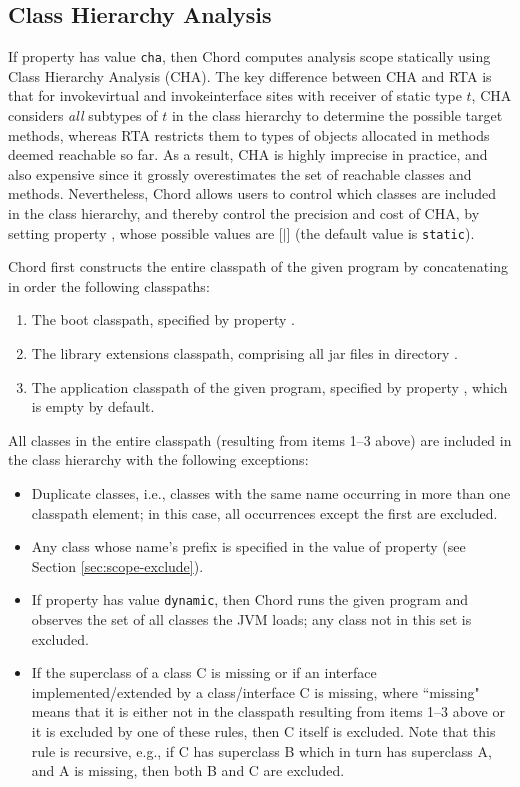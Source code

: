 \subsection{Class Hierarchy Analysis}

If property  has value {\tt cha}, then Chord
computes analysis scope statically using Class Hierarchy Analysis (CHA).
The key difference between CHA and RTA is that for invokevirtual and
invokeinterface sites with receiver of static type $t$, CHA considers
{\it all} subtypes of $t$ in the class hierarchy to determine the
possible target methods, whereas RTA restricts them to types of
objects allocated in methods deemed reachable so far.  As a result,
CHA is highly imprecise in practice, and also expensive since it
grossly overestimates the set of reachable classes and methods.
Nevertheless, Chord allows users to control which classes are
included in the class hierarchy, and thereby control the
precision and cost of CHA, by setting property ,
whose possible values are [$|$] (the default
value is {\tt static}).

Chord first constructs the entire classpath of the given program by
concatenating in order the following classpaths:

\begin{enumerate}
\item
The boot classpath, specified by property .
\item
The library extensions classpath, comprising all jar files in
directory .
\item
The application classpath of the given program, specified by property ,
which is empty by default.
\end{enumerate}

All classes in the entire classpath (resulting from items 1--3 above)
are included in the class hierarchy with the following exceptions:
\begin{itemize}
\item
Duplicate classes, i.e., classes with the same name occurring in more
than one classpath element; in this case, all occurrences except the
first are excluded.
\item
Any class whose name's prefix is specified in the value of property
 (see Section \ref{sec:scope-exclude}).
\item
If property  has value {\tt dynamic}, then
Chord runs the given program and observes the set of all classes the
JVM loads; any class not in this set is excluded.
\item
If the superclass of a class C is missing or if an interface
implemented/extended by a class/interface C is missing, where
``missing" means that it is either not in the classpath resulting from
items 1--3 above or it is excluded by one of these rules, then C
itself is excluded.  Note that this rule is recursive, e.g., if C has
superclass B which in turn has superclass A, and A is missing, then
both B and C are excluded.
\end{itemize}

